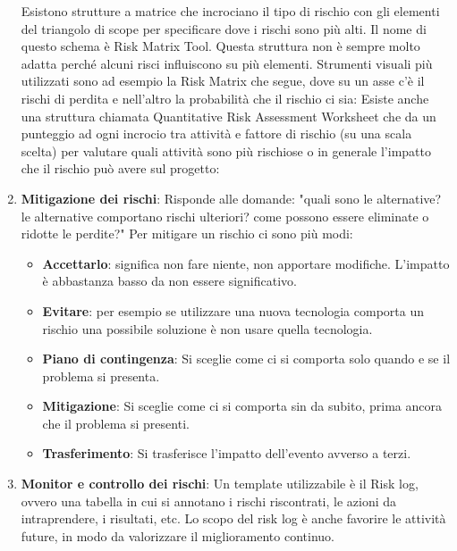 \begin{enumerate}
\begin{itemize}
	\end{itemize}
	Esistono strutture a matrice che incrociano il tipo di rischio con gli elementi del triangolo di scope per specificare dove i rischi sono più alti. Il nome di questo schema è Risk Matrix Tool. Questa struttura non è sempre molto adatta perché alcuni risci influiscono su più elementi. Strumenti visuali più utilizzati sono ad esempio la Risk Matrix che segue, dove su un asse c'è il rischi di perdita e nell'altro la probabilità che il rischio ci sia:
	Esiste anche una struttura chiamata Quantitative Risk Assessment Worksheet che da un punteggio ad ogni incrocio tra attività e fattore di rischio (su una scala scelta) per valutare quali attività sono più rischiose o in generale l'impatto che il rischio può avere sul progetto:
	\item \textbf{Mitigazione dei rischi}: Risponde alle domande: "quali sono le alternative? le alternative comportano rischi ulteriori? come possono essere eliminate o ridotte le perdite?"\newline
	Per mitigare un rischio ci sono più modi:
	\begin{itemize}
		\item \textbf{Accettarlo}: significa non fare niente, non apportare modifiche. L'impatto è abbastanza basso da non essere significativo.
		\item \textbf{Evitare}: per esempio se utilizzare una nuova tecnologia comporta un rischio una possibile soluzione è non usare quella tecnologia.
		\item \textbf{Piano di contingenza}: Si sceglie come ci si comporta solo quando e se il problema si presenta.
		\item \textbf{Mitigazione}:  Si sceglie come ci si comporta sin da subito, prima ancora che il problema si presenti.
		\item \textbf{Trasferimento}: Si trasferisce l'impatto dell'evento avverso a terzi.
	\end{itemize}
	\item \textbf{Monitor e controllo dei rischi}: Un template utilizzabile è il Risk log, ovvero una tabella in cui si annotano i rischi riscontrati, le azioni da intraprendere, i risultati, etc.\newline
	Lo scopo del risk log è anche favorire le attività future, in modo da valorizzare il miglioramento continuo.
\end{enumerate}
